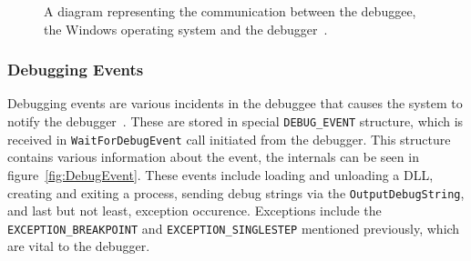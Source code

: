 \begin{figure}
    \centering
    \caption{A diagram representing the communication between the debuggee, the
    Windows operating system and the debugger~\cite{windows-dbg-api-rev}.}
    \label{fig:win32debugger}
\end{figure}
 
\subsubsection*{Debugging Events}\label{section:Debug Events}
Debugging events are various incidents in the debuggee that causes the system
to notify the debugger~\cite{windows-msdn-debug-events}. These are stored in
special \texttt{DEBUG_EVENT} structure, which is received in
\texttt{WaitForDebugEvent} call initiated from the debugger. This
structure contains various information about the event, the internals can be
seen in figure~\ref{fig:DebugEvent}. These events include loading and unloading
a DLL, creating and exiting a process, sending debug strings via the
\texttt{OutputDebugString}, and last but not least, exception occurence.
Exceptions include the \verb|EXCEPTION_BREAKPOINT| and
\verb|EXCEPTION_SINGLESTEP| mentioned previously, which are vital to the
debugger.

